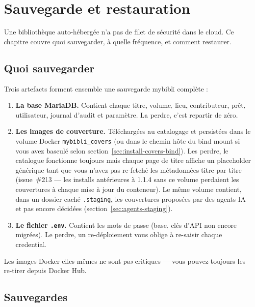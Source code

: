 \chapter{Sauvegarde et restauration}
\label{ch:backup}

Une bibliothèque auto-hébergée n'a pas de filet de sécurité dans le
cloud. Ce chapitre couvre quoi sauvegarder, à quelle fréquence, et
comment restaurer.

\section{Quoi sauvegarder}

Trois artefacts forment ensemble une sauvegarde mybibli complète :

\begin{enumerate}
  \item \textbf{La base MariaDB.} Contient
        chaque titre, volume, lieu, contributeur, prêt,
        utilisateur, journal d'audit et paramètre. La perdre,
        c'est repartir de zéro.
  \item \textbf{Les images de couverture.}
        Téléchargées au catalogage et persistées dans le volume
        Docker \texttt{mybibli\_covers} (ou dans le chemin hôte du
        bind mount si vous avez basculé selon
        section~\ref{sec:install-covers-bind}). Les perdre, le
        catalogue fonctionne toujours mais chaque page de titre
        affiche un placeholder générique tant que vous n'avez pas
        re-fetché les métadonnées titre par titre (issue~\#213 — les
        installs antérieures à 1.1.4 sans ce volume perdaient les
        couvertures à chaque mise à jour du conteneur). Le même
        volume contient, dans un dossier caché \texttt{.staging},
        les couvertures proposées par des agents IA et pas encore
        décidées (section~\ref{sec:agents-staging}).
  \item \textbf{Le fichier \texttt{.env}.}
        Contient les mots de passe (base, clés d'API non encore
        migrées). Le perdre, un re-déploiement vous oblige à
        re-saisir chaque credential.
\end{enumerate}

Les images Docker elles-mêmes ne sont \emph{pas} critiques — vous
pouvez toujours les re-tirer depuis Docker Hub.

\section{Sauvegardes}
\label{sec:backups}

